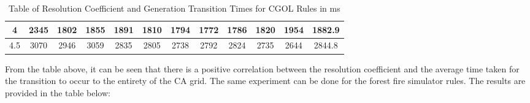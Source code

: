 \begin{center}
\begin{table}[H]
\begin{tabular}{|c|cccccccccc|c|}
4                                                                 & \multicolumn{1}{c|}{2345} & \multicolumn{1}{c|}{1802} & \multicolumn{1}{c|}{1855} & \multicolumn{1}{c|}{1891} & \multicolumn{1}{c|}{1810} & \multicolumn{1}{c|}{1794} & \multicolumn{1}{c|}{1772} & \multicolumn{1}{c|}{1786} & \multicolumn{1}{c|}{1820} & 1954 & 1882.9       \\ \hline
4.5                                                               & \multicolumn{1}{c|}{3070} & \multicolumn{1}{c|}{2946} & \multicolumn{1}{c|}{3059} & \multicolumn{1}{c|}{2835} & \multicolumn{1}{c|}{2805} & \multicolumn{1}{c|}{2738} & \multicolumn{1}{c|}{2792} & \multicolumn{1}{c|}{2824} & \multicolumn{1}{c|}{2735} & 2644 & 2844.8       \\ \hline
\end{tabular}
\caption{Table of Resolution Coefficient and Generation Transition Times for CGOL Rules in ms}
\end{table}
\end{center}
\noindent From the table above, it can be seen that there is a positive correlation between the resolution coefficient and the average time taken for the transition to occur to the entirety of the CA grid. The same experiment can be done for the forest fire simulator rules. The results are provided in the table below:
